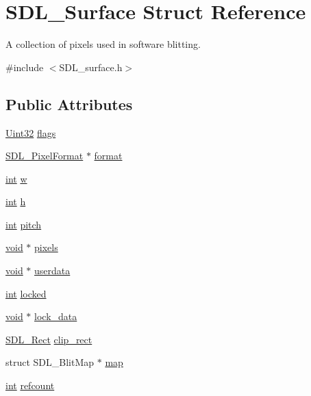 \hypertarget{struct_s_d_l___surface}{}\section{S\+D\+L\+\_\+\+Surface Struct Reference}
\label{struct_s_d_l___surface}


A collection of pixels used in software blitting.  




{\ttfamily \#include $<$S\+D\+L\+\_\+surface.\+h$>$}

\subsection*{Public Attributes}
\begin{DoxyCompactItemize}
\item 
\hyperlink{_s_d_l__stdinc_8h_add440eff171ea5f55cb00c4a9ab8672d}{Uint32} \hyperlink{struct_s_d_l___surface_a86d78b665d5dfd7aa1dd9696b067641b}{flags}
\item 
\hyperlink{struct_s_d_l___pixel_format}{S\+D\+L\+\_\+\+Pixel\+Format} $\ast$ \hyperlink{struct_s_d_l___surface_a0a90721f947c10c3b79e02ccb419ca62}{format}
\item 
\hyperlink{_s_d_l__thread_8h_a6a64f9be4433e4de6e2f2f548cf3c08e}{int} \hyperlink{struct_s_d_l___surface_a9b0ec7185dcdb2a3530a9160a6ea83d9}{w}
\item 
\hyperlink{_s_d_l__thread_8h_a6a64f9be4433e4de6e2f2f548cf3c08e}{int} \hyperlink{struct_s_d_l___surface_af33bcf87a1f5e10a99b3c7e8626b38c8}{h}
\item 
\hyperlink{_s_d_l__thread_8h_a6a64f9be4433e4de6e2f2f548cf3c08e}{int} \hyperlink{struct_s_d_l___surface_a5fa37325d77d65b2ed64ffc7cd01bb6c}{pitch}
\item 
\hyperlink{_s_d_l__opengles2__gl2ext_8h_ae5d8fa23ad07c48bb609509eae494c95}{void} $\ast$ \hyperlink{struct_s_d_l___surface_abd9597e0e084b8ef33fe0397bc26d911}{pixels}
\item 
\hyperlink{_s_d_l__opengles2__gl2ext_8h_ae5d8fa23ad07c48bb609509eae494c95}{void} $\ast$ \hyperlink{struct_s_d_l___surface_ae66d973dcb9b57cb34815892e1ee1f31}{userdata}
\item 
\hyperlink{_s_d_l__thread_8h_a6a64f9be4433e4de6e2f2f548cf3c08e}{int} \hyperlink{struct_s_d_l___surface_a5022edaeea1c0a055fa5d6dccba41de2}{locked}
\item 
\hyperlink{_s_d_l__opengles2__gl2ext_8h_ae5d8fa23ad07c48bb609509eae494c95}{void} $\ast$ \hyperlink{struct_s_d_l___surface_a0afacfb933b54a9af0846a307a6924fb}{lock\+\_\+data}
\item 
\hyperlink{struct_s_d_l___rect}{S\+D\+L\+\_\+\+Rect} \hyperlink{struct_s_d_l___surface_aa9a0da3b38261dad6cf0cc4e3bb5b0c3}{clip\+\_\+rect}
\item 
struct S\+D\+L\+\_\+\+Blit\+Map $\ast$ \hyperlink{struct_s_d_l___surface_a8c1ecad399b0d4f525b1a53b6ee9393f}{map}
\item 
\hyperlink{_s_d_l__thread_8h_a6a64f9be4433e4de6e2f2f548cf3c08e}{int} \hyperlink{struct_s_d_l___surface_a03d10628a359c0674f5ceffd574f1641}{refcount}
\end{DoxyCompactItemize}


